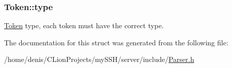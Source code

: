 \subsubsection[{\texorpdfstring{type}{type}}]{ Token\+::type}\hypertarget{structToken_a789b6f0ef869794e8edeaff2d1f67cc5}{}\label{structToken_a789b6f0ef869794e8edeaff2d1f67cc5}


\hyperlink{structToken}{Token} type, each token must have the correct type. 



The documentation for this struct was generated from the following file\+:\begin{DoxyCompactItemize}
\item 
/home/denis/\+C\+Lion\+Projects/my\+S\+S\+H/server/include/\hyperlink{Parser_8h}{Parser.\+h}\end{DoxyCompactItemize}
